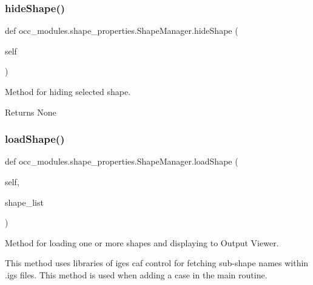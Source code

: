 \subsubsection{\texorpdfstring{hide\+Shape()}{hideShape()}}
{\footnotesize\ttfamily def occ\+\_\+modules.\+shape\+\_\+properties.\+Shape\+Manager.\+hide\+Shape (\begin{DoxyParamCaption}\item[{}]{self }\end{DoxyParamCaption})}



Method for hiding selected shape. 

\begin{DoxyReturn}{Returns}
None 
\end{DoxyReturn}
\hypertarget{a00101_a8833b4dba535cb76318777c031cf08b5}{}\label{a00101_a8833b4dba535cb76318777c031cf08b5} 
\subsubsection{\texorpdfstring{load\+Shape()}{loadShape()}}
{\footnotesize\ttfamily def occ\+\_\+modules.\+shape\+\_\+properties.\+Shape\+Manager.\+load\+Shape (\begin{DoxyParamCaption}\item[{}]{self,  }\item[{}]{shape\+\_\+list }\end{DoxyParamCaption})}



Method for loading one or more shapes and displaying to Output Viewer. 

This method uses libraries of iges caf control for fetching sub-\/shape names within .igs files. This method is used when adding a case in the main routine.


